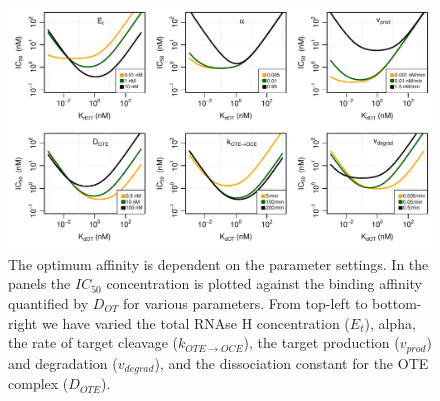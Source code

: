 \documentclass[a4paper,11pt]{article}
\begin{document}
\begin{figure}[!h]
\begin{center}
\includegraphics[width=\textwidth]{SuppFile1-S2.pdf}
\end{center}
\caption{The optimum affinity is dependent on the parameter settings. In the panels the $IC_{50}$ concentration is plotted against the binding affinity quantified by $D_{OT}$ for various parameters. From top-left to bottom-right we have varied the total RNAse H concentration ($E_t$), alpha, the rate of target cleavage ($k_{OTE \to OCE}$), the target production ($v_{prod}$) and degradation ($v_{degrad}$), and the dissociation constant for the OTE complex ($D_{OTE}$).}\label{fig::Opt}
\end{figure}
\end{document}
